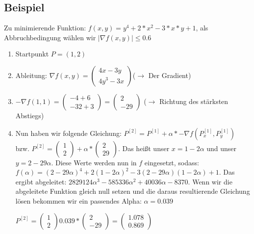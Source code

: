 \documentclass[a4paper, 11pt]{article}
\begin{document}
      \subsection{Beispiel}
      
      Zu minimierende Funktion: $f(x,y) = y^4+2*x^2-3*x*y+1$, als Abbruchbedingung wählen wir $|{\nabla}f(x,y)| \leq 0.6$
      
\begin{enumerate}

	\item 
	Startpunkt $P=(1,2)$
	\item 
	Ableitung: ${\nabla}f(x,y)=
	\left( \begin{array}{c}
	4x-3y \\ 
	4y^3-3x 
	\end{array} \right)
	$($\rightarrow$ Der Gradient)
	\item
	$-{\nabla}f(1,1) =
	\left( \begin{array}{c}
	-4+6 \\ 
	-32+3 
	\end{array} \right)
	=
	\left( \begin{array}{c}
	2 \\ 
	-29
	\end{array} \right)
	$ ($\rightarrow$ Richtung des stärksten Abstiegs)
	
	\item
	Nun haben wir folgende Gleichung: $P^{[2]}=P^{[1]}+\alpha*-{\nabla}f(P^{[1]}_{x},P^{[1]}_{y})$ bzw. $P^{[2]}=\left( \begin{array}{c} 1 \\ 2 \end{array} \right) + \alpha * \left( \begin{array}{c} 2 \\ 29 \end{array} \right)$. Das heißt unser $x=1-2{\alpha}$ und unser $y=2-29{\alpha}$. Diese Werte werden nun in $f$ eingesetzt, sodass: $f({\alpha})=(2-29{\alpha})^4+2(1-2{\alpha})^2-3(2-29{\alpha})(1-2{\alpha})+1$. Das ergibt abgeleitet: $2829124{\alpha}^3-585336{\alpha}^2+40036{\alpha}-8370$. Wenn wir die abgeleitete Funktion gleich null setzen und die daraus resultierende Gleichung lösen bekommen wir ein passendes Alpha: ${\alpha}=0.039$
	
	$P^{[2]}=\left( \begin{array}{c} 1 \\ 2 \end{array} \right) 0.039 * \left( \begin{array}{c} 2 \\ -29 \end{array} \right) = \left( \begin{array}{c} 1.078 \\ 0.869 \end{array} \right)$


\end{enumerate}
\end{document}
